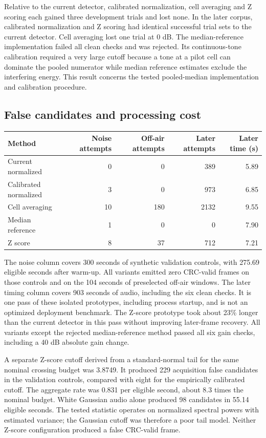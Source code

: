 \documentclass[11pt,a4paper]{article}
\begin{document}
Relative to the current detector, calibrated normalization, cell
averaging and Z scoring each gained three development trials and lost
none. In the later corpus, calibrated normalization and Z scoring had
identical successful trial sets to the current detector. Cell averaging
lost one trial at $0$ dB. The median-reference implementation failed
all clean checks and was rejected. Its continuous-tone calibration
required a very large cutoff because a tone at a pilot cell can dominate
the pooled numerator while median reference estimates exclude the
interfering energy. This result concerns the tested pooled-median
implementation and calibration procedure.

\subsection{False candidates and processing cost}

\begin{center}
\begin{tabular}{@{}lrrrr@{}}
\toprule
Method & Noise attempts & Off-air attempts & Later attempts & Later time (s) \\
\midrule
Current normalized & 0 & 0 & 389 & 5.89 \\
Calibrated normalized & 3 & 0 & 973 & 6.85 \\
Cell averaging & 10 & 180 & 2132 & 9.55 \\
Median reference & 1 & 0 & 0 & 7.90 \\
Z score & 8 & 37 & 712 & 7.21 \\
\bottomrule
\end{tabular}
\end{center}

The noise column covers 300 seconds of synthetic validation controls,
with 275.69 eligible seconds after warm-up. All variants emitted zero
CRC-valid frames on those controls and on the 104 seconds of preselected
off-air windows. The later timing column covers 903 seconds of audio,
including the six clean checks. It is one pass of these isolated
prototypes, including process startup, and is not an optimized deployment
benchmark. The Z-score prototype took about 23\% longer than the current
detector in this pass without improving later-frame recovery.
All variants except the rejected median-reference method passed all
six gain checks, including a 40 dB absolute gain change.

A separate Z-score cutoff derived from a standard-normal tail for the
same nominal crossing budget was 3.8749. It produced 229 acquisition
false candidates in the validation controls, compared with eight for the
empirically calibrated cutoff. The aggregate rate was 0.831 per eligible
second, about 8.3 times the nominal budget. White Gaussian audio alone
produced 98 candidates in 55.14 eligible seconds. The tested statistic
operates on normalized spectral powers with estimated variance; the
Gaussian cutoff was therefore a poor tail model. Neither Z-score
configuration produced a false CRC-valid frame.
\end{document}
